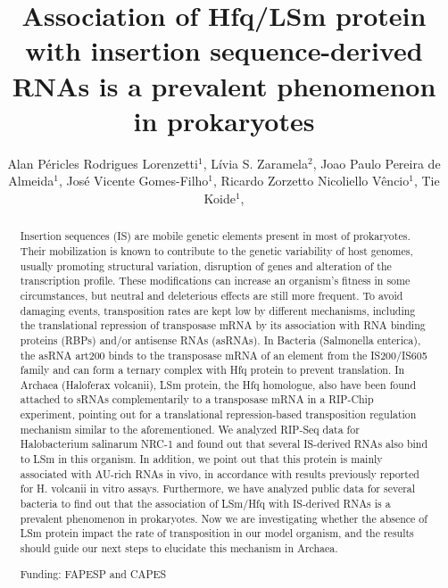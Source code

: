 \documentclass[twoside]{article}
\title{\vspace{-15mm}\fontsize{24pt}{10pt}\selectfont\textbf{ Association of Hfq/LSm protein with insertion sequence-derived RNAs is a prevalent phenomenon in prokaryotes }} %
\author{ Alan Péricles Rodrigues Lorenzetti$^{1}$, Lívia S. Zaramela$^{2}$, Joao Paulo Pereira de Almeida$^{1}$, José Vicente Gomes-Filho$^{1}$, Ricardo Zorzetto Nicoliello Vêncio$^{1}$, Tie Koide$^{1}$, }
\affil{ 1 University of São Paulo

2 University of California San Diego

 }
\date{}
\begin{document}
  
  
  \maketitle %
  
  
  \thispagestyle{fancy} %
  
  
  \begin{abstract}
  Insertion sequences (IS) are mobile genetic elements present in most of prokaryotes. Their mobilization is known to contribute to the genetic variability of host genomes, usually promoting structural variation, disruption of genes and alteration of the transcription profile. These modifications can increase an organism’s fitness in some circumstances, but neutral and deleterious effects are still more frequent. To avoid damaging events, transposition rates are kept low by different mechanisms, including the translational repression of transposase mRNA by its association with RNA binding proteins (RBPs) and/or antisense RNAs (asRNAs). In Bacteria (Salmonella enterica), the asRNA art200 binds to the transposase mRNA of an element from the IS200/IS605 family and can form a ternary complex with Hfq protein to prevent translation. In Archaea (Haloferax volcanii), LSm protein, the Hfq homologue, also have been found attached to sRNAs complementarily to a transposase mRNA in a RIP-Chip experiment, pointing out for a translational repression-based transposition regulation mechanism similar to the aforementioned. We analyzed RIP-Seq data for Halobacterium salinarum NRC-1 and found out that several IS-derived RNAs also bind to LSm in this organism. In addition, we point out that this protein is mainly associated with AU-rich RNAs in vivo, in accordance with results previously reported for H. volcanii in vitro assays. Furthermore, we have analyzed public data for several bacteria to find out that the association of LSm/Hfq with IS-derived RNAs is a prevalent phenomenon in prokaryotes. Now we are investigating whether the absence of LSm protein impact the rate of transposition in our model organism, and the results should guide our next steps to elucidate this mechanism in Archaea.
  
  Funding: FAPESP and CAPES \\ 
  \end{abstract}
  
\end{document}
